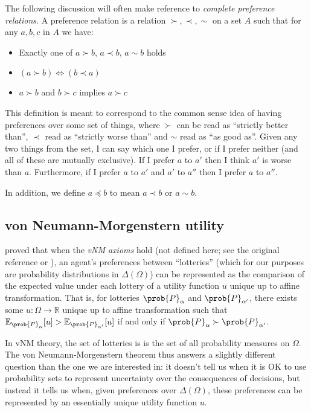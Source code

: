 The following discussion will often make reference to \emph{complete preference relations}. A preference relation is a relation $\succ,\prec,\sim$ on a set $A$ such that for any $a,b,c$ in $A$ we have:
\begin{itemize}
    \item Exactly one of $a\succ b$, $a\prec b$, $a\sim b$ holds
    \item $(a\succ b)\iff(b\prec a)$
    \item $a\succ b$ and $b\succ c$ implies $a\succ c$
\end{itemize}

This definition is meant to correspond to the common sense idea of having preferences over some set of things, where $\succ$ can be read as ``strictly better than'', $\prec$ read as ``strictly worse than'' and $\sim$ read as ``as good as''. Given any two things from the set, I can say which one I prefer, or if I prefer neither (and all of these are mutually exclusive). If I prefer $a$ to $a'$ then I think $a'$ is worse than $a$. Furthermore, if I prefer $a$ to $a'$ and $a'$ to $a''$ then I prefer $a$ to $a''$.

In addition, we define $a\preceq b$ to mean $a\prec b$ or $a \sim b$.

\subsection{von Neumann-Morgenstern utility}

\citet{von_neumann_theory_1944} proved that when the \emph{vNM axioms} hold (not defined here; see the original reference or \citet{steele_decision_2020}), an agent's preferences between ``lotteries'' (which for our purposes are probability distributions in $\Delta(\Omega)$) can be represented as the comparison of the expected value under each lottery of a utility function $u$ unique up to affine transformation. That is, for lotteries $\prob{P}_\alpha$ and $\prob{P}_{\alpha'}$, there exists some $u:\Omega\to \mathbb{R}$ unique up to affine transformation such that $\mathbb{E}_{\prob{P}_\alpha}[u]> \mathbb{E}_{\prob{P}_{\alpha'}}[u]$ if and only if $\prob{P}_{\alpha} \succ \prob{P}_{\alpha'}$.

In vNM theory, the set of lotteries is is the set of all probability measures on $\Omega$. The von Neumann-Morgenstern theorem thus answers a slightly different question than the one we are interested in: it doesn't tell us when it is OK to use probability sets to represent uncertainty over the consequences of decisions, but instead it tells us when, given preferences over $\Delta(\Omega)$, these preferences can be represented by an essentially unique utility function $u$.

